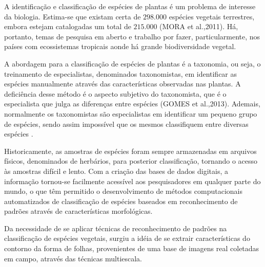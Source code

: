 A identificação e classificação de espécies de plantas é um problema de interesse da biologia. Estima-se que existam certa de $298.000$ espécies vegetais terrestres, embora estejam catalogadas um total de $215.000$ (MORA et al.,2011). Há, portanto, temas de pesquisa em aberto e trabalho por fazer, particularmente, nos países com ecossistemas tropicais aonde há grande biodiversidade vegetal.

A abordagem para a classificação de espécies de plantas é a taxonomia, ou seja, o treinamento de especialistas, denominados taxonomistas, em identificar as espécies manualmente  através das características observadas nas plantas. A deficiência desse método é o aspecto subjetivo do taxonomista, que é o especialista que julga as diferenças entre espécies (GOMES et al.,2013). Ademais, normalmente os taxonomistas são especialistas em identificar um pequeno grupo de espécies, sendo assim impossível que os mesmos classifiquem entre diversas espécies \cite{Cope20127562}.

Historicamente, as amostras de espécies foram sempre armazenadas em arquivos físicos, denominados de herbários, para posterior classificação, tornando o acesso às amostras difícil e lento. Com a criação das bases de dados digitais, a informação tornou-se facilmente acessível aos pesquisadores em qualquer parte do mundo, o que têm permitido o desenvolvimento de métodos computacionais automatizados de classificação de espécies baseados em reconhecimento de padrões através de características morfológicas.


Da necessidade de se aplicar técnicas de reconhecimento de padrões na classificação de espécies vegetais, surgiu a idéia de se extrair características do contorno da forma de folhas, provenientes de uma base de imagens real coletadas em campo, através das técnicas multiescala.



 

